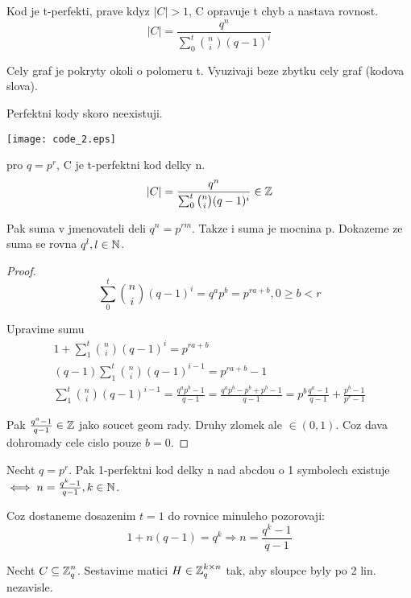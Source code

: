 \begin{definition}
	Kod je t-perfekti, prave kdyz $|C| > 1$, C opravuje t chyb a nastava rovnost.
	\[ |C| = \frac{q^n}{\sum_0^t \binom{n}{i} (q - 1)^i} \]

	Cely graf je pokryty okoli o polomeru t. Vyuzivaji beze zbytku cely graf (kodova slova).
\end{definition}

\begin{note}
	Perfektni kody skoro neexistuji.

	\texttt{[image: code\_2.eps]}
\end{note}

\begin{observation}
	pro $q = p^r$, C je t-perfektni kod delky n.
	\[ |C| = \frac{q^n}{\sum_0^t \binom{n}{i} (q - 1)^i} \in \operatorname{\mathbb{Z}} \]

	Pak suma v jmenovateli deli $q^n = p^{rm}$. Takze i suma je mocnina p. Dokazeme ze suma se rovna $q^l, l \in \operatorname{\mathbb{N}}$.

\end{observation}

\begin{proof}
	\[ \sum_0^t \binom{n}{i} (q - 1)^i = q^a p^b = p^{ra + b}, 0 \geq b < r \]

	Upravime sumu
	\begin{gather*}
	1 + \sum_1^t \binom{n}{i} (q - 1)^i = p^{ra + b}\\
	(q - 1)\sum_1^t \binom{n}{i} (q - 1)^{i - 1} = p^{ra + b} - 1\\
	\sum_1^t \binom{n}{i} (q - 1)^{i - 1} = \frac{q^ap^b - 1}{q - 1} = \frac{q^ap^b - p^b + p^b - 1}{q - 1} = p^b \frac{q^a - 1}{q - 1} + \frac{p^b - 1}{p^r - 1}
	\end{gather*}

	Pak $\frac{q^a - 1}{q - 1} \in \operatorname{\mathbb{Z}}$ jako soucet geom rady. Druhy zlomek ale $\in (0, 1)$. Coz dava dohromady cele cislo pouze $b = 0$.
\end{proof}

\begin{theorem}
	Necht $q = p^r$. Pak 1-perfektni kod delky n nad abcdou o 1 symbolech existuje $\iff n = \frac{q^k - 1}{q - 1}, k \in \operatorname{\mathbb{N}}$.

	Coz dostaneme dosazenim $t = 1$ do rovnice minuleho pozorovaji:
	\[ 1 + n(q - 1) = q^k \Rightarrow n = \frac{q^k - 1}{q - 1} \]
\end{theorem}
	Necht $C \subseteq \operatorname{\mathbb{Z}}_q^n$. Sestavime matici $H \in \operatorname{\mathbb{Z}}_q^{k \times n}$ tak, aby sloupce byly po 2 lin. nezavisle.

